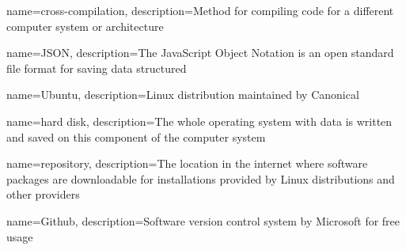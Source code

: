 {
    name={cross-compilation},
    description={Method for compiling code for a different computer system or architecture}
}

{
    name={JSON},
    description={The JavaScript Object Notation is an open standard file format for saving data structured}
}

{
    name={Ubuntu},
    description={Linux distribution maintained by Canonical}
}

{
    name={hard disk},
    description={The whole operating system with data is written and saved on this component of the computer system}
}

{
    name={repository},
    description={The location in the internet where software packages are downloadable for installations provided by Linux distributions and other providers}
}

{
    name={Github},
    description={Software version control system by Microsoft for free usage}
}

\glsaddall
